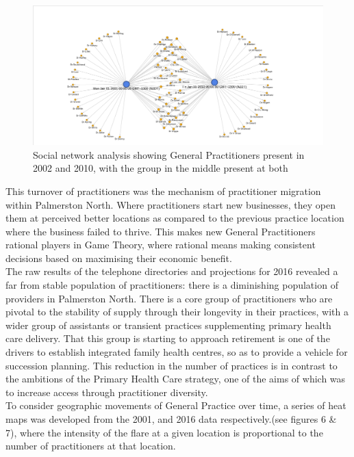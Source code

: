 \documentclass[11pt,a4paper]{article}
\begin{document}
\begin{figure}[htp]
\centering
\includegraphics[scale=0.4]{fig3.png}
\caption{Social network analysis showing General Practitioners present in 2002 and 2010, with the group in the middle present at both}
\label{General Practitioners present in 2002 and 2010}
\end{figure}


This turnover of practitioners was the mechanism of practitioner migration within Palmerston North. Where practitioners start new businesses, they open them at perceived better locations as compared to the previous practice location where the business failed to thrive. This makes new General Practitioners rational players in Game Theory, where rational means making consistent decisions based on maximising their economic benefit. \\


The raw results of the telephone directories and projections for 2016 revealed a far from stable population of practitioners: there is a diminishing population of providers in Palmerston North. There is a core group of practitioners who are pivotal to the stability of supply through their longevity in their practices, with a wider group of assistants or transient practices supplementing primary health care delivery. That this group is starting to approach retirement is one of the drivers to establish integrated family health centres, so as to provide a vehicle for succession planning. This reduction in the number of practices is in contrast to the ambitions of the Primary Health Care strategy, one of the aims of which was to increase access through practitioner diversity.  \\


To consider geographic movements of General Practice over time, a series of heat maps was developed from the 2001, and 2016 data respectively.(see figures 6 \& 7), where  the intensity of the flare at a given location is proportional to the number of practitioners at that location.\\ 
\end{document}
